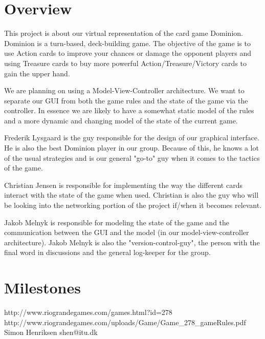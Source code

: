 \documentclass[12pt,a4paper,notitlepage]{article}
\begin{document}
\section{Overview}
This project is about our virtual representation of the card game Dominion. Dominion is a turn-based, deck-building game. The objective of the game is to use Action cards to improve your chances or damage the opponent players and using Treasure cards to buy more powerful Action/Treasure/Victory cards to gain the upper hand. 

We are planning on using a Model-View-Controller architecture. We want to separate our GUI from both the game rules and the state of the game via the controller. In essence we are likely to have a somewhat static model of the rules and a more dynamic and changing model of the state of the current game.

Frederik Lysgaard is the guy responsible for the design of our graphical interface. He is also the best Dominion player in our group. Because of this, he knows a lot of the usual strategies and is our general "go-to" guy when it comes to the tactics of the game.

Christian Jensen is responsible for implementing the way the different cards interact with the state of the game when used. Christian is also the guy who will be looking into the networking portion of the project if/when it becomes relevant.

Jakob Melnyk is responsible for modeling the state of the game and the communication between the GUI and the model (in our model-view-controller architecture). Jakob  Melnyk is also the "version-control-guy", the person with the final word in discussions and the general log-keeper for the group.
\pagebreak

\pagebreak


\pagebreak

\section{Milestones}



\begin{thebibliography}{9}
 http://www.riograndegames.com/games.html?id=278
 http://www.riograndegames.com/uploads/Game/Game\_278\_gameRules.pdf
 Simon Henriksen shen{\makeatletter @\makeatother}itu.dk
\end{thebibliography}
\end{document}
